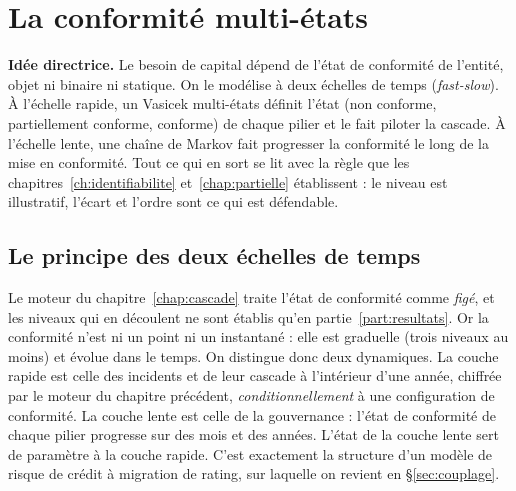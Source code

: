\chapter{La conformité multi-états}
\label{chap:multietats}

\begin{cle}
\textbf{Idée directrice.} Le besoin de capital dépend de l'état de conformité de l'entité,
objet ni binaire ni statique. On le modélise à deux échelles de temps (\emph{fast-slow}). À
l'échelle rapide, un Vasicek multi-états définit l'état (non conforme, partiellement conforme,
conforme) de chaque pilier et le fait piloter la cascade. À l'échelle lente, une chaîne de Markov
fait progresser la conformité le long de la mise en conformité. Tout ce qui en sort se lit avec
la règle que les chapitres~\ref{ch:identifiabilite} et~\ref{chap:partielle} établissent : le
niveau est illustratif, l'écart et l'ordre sont ce qui est défendable.
\end{cle}

\section{Le principe des deux échelles de temps}

Le moteur du chapitre~\ref{chap:cascade} traite l'état de conformité
comme \emph{figé}, et les niveaux qui en découlent ne sont établis qu'en
partie~\ref{part:resultats}. Or la
conformité n'est ni un point ni un instantané : elle est graduelle (trois niveaux au moins) et
évolue dans le temps. On distingue donc deux dynamiques. La couche rapide est celle des
incidents et de leur cascade à l'intérieur d'une année, chiffrée par le moteur du
chapitre précédent, \emph{conditionnellement} à une configuration de conformité. La couche
lente est celle de la gouvernance : l'état de conformité de chaque pilier progresse sur des
mois et des années. L'état de la couche lente sert de paramètre à la couche rapide.
C'est exactement la structure d'un modèle de risque de crédit à migration de rating, sur
laquelle on revient en \S\ref{sec:couplage}.

